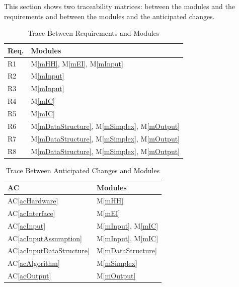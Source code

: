 \documentclass[12pt, titlepage]{article}
\newcommand{\acref}[1]{AC\ref{#1}}
\newcommand{\mref}[1]{M\ref{#1}}
\begin{document}
This section shows two traceability matrices: between the modules and the
requirements and between the modules and the anticipated changes.

\begin{table}[H]
\centering
\begin{tabular}{p{} p{}}
\toprule
\textbf{Req.} & \textbf{Modules}\\
\midrule
R1 & \mref{mHH}, \mref{mEI}, \mref{mInput}\\
R2 & \mref{mInput}\\
R3 & \mref{mInput}\\
R4 & \mref{mIC}\\
R5 & \mref{mIC}\\
R6 & \mref{mDataStructure}, \mref{mSimplex}, \mref{mOutput}\\
R7 & \mref{mDataStructure}, \mref{mSimplex}, \mref{mOutput}\\
R8 & \mref{mDataStructure}, \mref{mSimplex}, \mref{mOutput}\\
\bottomrule
\end{tabular}
\caption{Trace Between Requirements and Modules}
\label{TblRT}
\end{table}

\begin{table}[H]
\centering
\begin{tabular}{p{} p{}}
\toprule
\textbf{AC} & \textbf{Modules}\\
\midrule
\acref{acHardware} & \mref{mHH}\\
\acref{acInterface} & \mref{mEI}\\
\acref{acInput} & \mref{mInput}, \mref{mIC}\\
\acref{acInputAssumption} & \mref{mInput}, \mref{mIC}\\
\acref{acInputDataStructure} & \mref{mDataStructure}\\
\acref{acAlgorithm} & \mref{mSimplex}\\
\acref{acOutput} & \mref{mOutput}\\
\bottomrule
\end{tabular}
\caption{Trace Between Anticipated Changes and Modules}
\label{TblACT}
\end{table}

 
\end{document}
